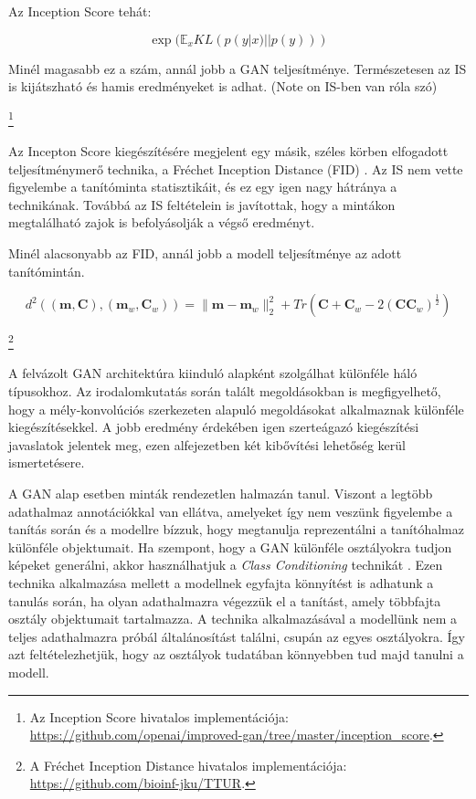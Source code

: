 Az Inception Score tehát:

$$ \exp(\mathbb{E}_x KL(p(y|x)||p(y))) $$

Minél magasabb ez a szám, annál jobb a GAN teljesítménye. Természetesen az IS is kijátszható és hamis eredményeket is adhat. (Note on IS-ben van róla szó)


\footnote{Az Inception Score hivatalos implementációja: \url{https://github.com/openai/improved-gan/tree/master/inception\_score}.}


Az Incepton Score kiegészítésére megjelent egy másik, széles körben elfogadott teljesítménymerő technika, a Fréchet Inception Distance (FID) \cite{heusel2017gans}. Az IS nem vette figyelembe a tanítóminta statisztikáit, és ez egy igen nagy hátránya a technikának. Továbbá az IS feltételein is javítottak, hogy a mintákon megtalálható zajok is befolyásolják a végső eredményt.


Minél alacsonyabb az FID, annál jobb a modell teljesítménye az adott tanítómintán.

$$ d^2((\boldsymbol{m}, \boldsymbol{C}), (\boldsymbol{m}_w, \boldsymbol{C}_w)) = \|\boldsymbol{m} - \boldsymbol{m}_w \|_2^2 + Tr(\boldsymbol{C} + \boldsymbol{C}_w - 2(\boldsymbol{C}\boldsymbol{C}_w)^{\frac{1}{2}}) $$


\footnote{A Fréchet Inception Distance hivatalos implementációja: \url{https://github.com/bioinf-jku/TTUR}.}




A felvázolt GAN architektúra kiinduló alapként szolgálhat különféle háló típusokhoz. Az irodalomkutatás során talált megoldásokban is megfigyelhető, hogy a mély-konvolúciós szerkezeten alapuló megoldásokat alkalmaznak különféle kiegészítésekkel. A jobb eredmény érdekében igen szerteágazó kiegészítési javaslatok jelentek meg, ezen alfejezetben két kibővítési lehetőség kerül ismertetésere.


A GAN alap esetben minták rendezetlen halmazán tanul. Viszont a legtöbb adathalmaz annotációkkal van ellátva, amelyeket így nem veszünk figyelembe a tanítás során és a modellre bízzuk, hogy megtanulja reprezentálni a tanítóhalmaz különféle objektumait. Ha szempont, hogy a GAN különféle osztályokra tudjon képeket generálni, akkor használhatjuk a \textit{Class Conditioning} technikát \cite{mirza2014conditional}. Ezen technika alkalmazása mellett a modellnek egyfajta könnyítést is adhatunk a tanulás során, ha olyan adathalmazra végezzük el a tanítást, amely többfajta osztály objektumait tartalmazza. A technika alkalmazásával a modellünk nem a teljes adathalmazra próbál általánosítást találni, csupán az egyes osztályokra. Így azt feltételezhetjük, hogy az osztályok tudatában könnyebben tud majd tanulni a modell.

